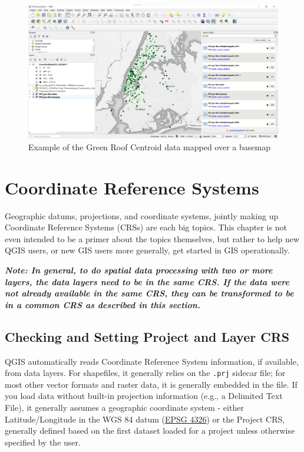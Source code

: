 \documentclass[
  letterpaper,
  DIV=11,
  numbers=noendperiod]{scrreprt}
\begin{document}
\begin{figure}

{\centering \includegraphics{./images/qms_nyc_basemap.png}

}

\caption{Example of the Green Roof Centroid data mapped over a basemap}

\end{figure}


\hypertarget{projections}{%
\chapter{Coordinate Reference Systems}\label{projections}}

Geographic datums, projections, and coordinate systems, jointly making
up Coordinate Reference Systems (CRSs) are each big topics. This chapter
is not even intended to be a primer about the topics themselves, but
rather to help new QGIS users, or new GIS users more generally, get
started in GIS operationally.

\textbf{\emph{Note: In general, to do spatial data processing with two
or more layers, the data layers need to be in the same CRS. If the data
were not already available in the same CRS, they can be transformed to
be in a common CRS as described in this section.}}

\hypertarget{checking-and-setting-project-and-layer-crs}{%
\section{Checking and Setting Project and Layer
CRS}\label{checking-and-setting-project-and-layer-crs}}

QGIS automatically reads Coordinate Reference System information, if
available, from data layers. For shapefiles, it generally relies on the
\texttt{.prj} sidecar file; for most other vector formats and raster
data, it is generally embedded in the file. If you load data without
built-in projection information (e.g., a Delimited Text File), it
generally assumes a geographic coordinate system - either
Latitude/Longitude in the WGS 84 datum (\href{https://epsg.io/4326}{EPSG
4326}) or the Project CRS, generally defined based on the first dataset
loaded for a project unless otherwise specified by the user.
\end{document}
